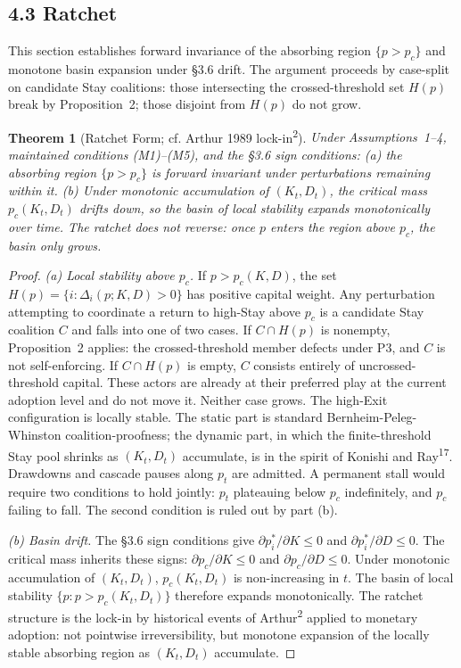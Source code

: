\documentclass[12pt]{article}
\newtheorem{theorem}{Theorem}
\theoremstyle{definition}
\theoremstyle{remark}
\begin{document}
\subsection{4.3 Ratchet}

This section establishes forward invariance of the absorbing region $\{p > p_c\}$ and monotone basin expansion under \S3.6 drift. The argument proceeds by case-split on candidate Stay coalitions: those intersecting the crossed-threshold set $H(p)$ break by Proposition~2; those disjoint from $H(p)$ do not grow.

\begin{theorem}[Ratchet Form; cf. Arthur 1989 lock-in\textsuperscript{2}]
Under Assumptions~1--4, maintained conditions (M1)--(M5), and
the \S3.6 sign conditions: (a) the absorbing region $\{p > p_c\}$ is forward invariant under perturbations remaining within it. (b) Under
monotonic accumulation of $(K_t, D_t)$, the critical mass
$p_c(K_t, D_t)$ drifts down, so the basin of local stability
expands monotonically over time. The ratchet does not reverse: once $p$ enters the region above $p_c$, the basin only grows.
\end{theorem}

\begin{proof}
\emph{(a) Local stability above $p_c$.} If $p > p_c(K, D)$, the set $H(p) = \{i : \Delta_i(p; K, D) > 0\}$ has
positive capital weight. Any perturbation attempting to coordinate
a return to high-Stay above $p_c$ is a candidate Stay coalition
$C$ and falls into one of two cases. If $C \cap H(p)$ is
nonempty, Proposition~2 applies: the crossed-threshold member
defects under P3, and $C$ is not self-enforcing. If $C \cap H(p)$
is empty, $C$ consists entirely of uncrossed-threshold capital. These actors are already at their preferred play at the current adoption level and do not move it. Neither case grows.
The high-Exit configuration is locally stable. The static part is standard
Bernheim-Peleg-Whinston coalition-proofness; the dynamic part,
in which the finite-threshold Stay pool shrinks as
$(K_t, D_t)$ accumulate, is in the spirit of Konishi and
Ray\textsuperscript{17}. Drawdowns and cascade pauses along $p_t$ are admitted. A permanent stall would require two conditions to hold jointly: $p_t$ plateauing below $p_c$ indefinitely, and $p_c$ failing to fall. The second condition is ruled out by part (b).

\emph{(b) Basin drift.} The \S3.6 sign conditions give
$\partial p_i^*/\partial K \leq 0$ and $\partial p_i^*/\partial D
\leq 0$. The critical mass inherits these signs: $\partial p_c/
\partial K \leq 0$ and $\partial p_c/\partial D \leq 0$. Under
monotonic accumulation of $(K_t, D_t)$, $p_c(K_t, D_t)$ is
non-increasing in $t$. The basin of local stability $\{p : p >
p_c(K_t, D_t)\}$ therefore expands monotonically. The ratchet
structure is the lock-in by historical events of
Arthur\textsuperscript{2} applied to monetary adoption: not
pointwise irreversibility, but monotone expansion of the
locally stable absorbing region as $(K_t, D_t)$ accumulate.
\end{proof}
\end{document}
